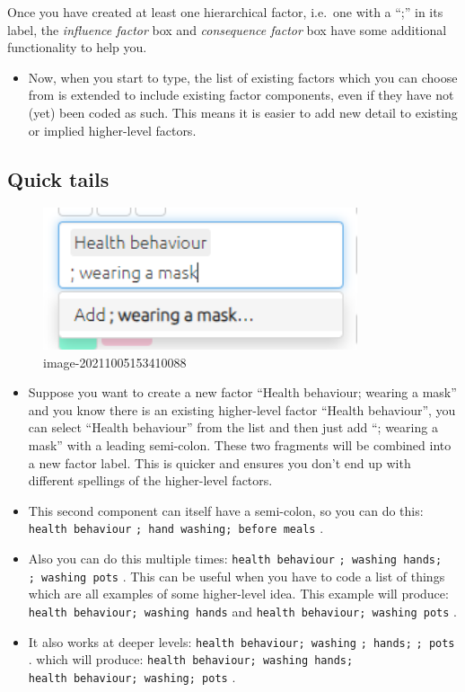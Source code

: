 \documentclass[
]{book}
\providecommand{\tightlist}{%
  \setlength{\itemsep}{0pt}\setlength{\parskip}{0pt}}
\begin{document}
Once you have created at least one hierarchical factor, i.e.~one with a ``;'' in its label, the \emph{influence factor} box and \emph{consequence factor} box have some additional functionality to help you.

\begin{itemize}
\tightlist
\item
  Now, when you start to type, the list of existing factors which you can choose from is extended to include existing factor components, even if they have not (yet) been coded as such. This means it is easier to add new detail to existing or implied higher-level factors.
\end{itemize}

\hypertarget{xquick-tails}{%
\subsection{Quick tails}\label{xquick-tails}}

\begin{figure}
\centering
\includegraphics[width=3.64583in,height=\textheight]{_assets/image-20211005153410088.png}
\caption{image-20211005153410088}
\end{figure}

\begin{itemize}
\tightlist
\item
  Suppose you want to create a new factor ``Health behaviour; wearing a mask'' and you know there is an existing higher-level factor ``Health behaviour'', you can select ``Health behaviour'' from the list and then just add ``; wearing a mask'' with a leading semi-colon. These two fragments will be combined into a new factor label. This is quicker and ensures you don't end up with different spellings of the higher-level factors.
\item
  This second component can itself have a semi-colon, so you can do this: \texttt{health\ behaviour} \texttt{;\ hand\ washing;\ before\ meals} .
\item
  Also you can do this multiple times:
  \texttt{health\ behaviour} \texttt{;\ washing\ hands;} \texttt{;\ washing\ pots} .
  This can be useful when you have to code a list of things which are all examples of some higher-level idea.
  This example will produce:
  \texttt{health\ behaviour;\ washing\ hands} and \texttt{health\ behaviour;\ washing\ pots} .
\item
  It also works at deeper levels:
  \texttt{health\ behaviour;\ washing} \texttt{;\ hands;} \texttt{;\ pots} .
  which will produce:
  \texttt{health\ behaviour;\ washing\ hands;} \texttt{health\ behaviour;\ washing;\ pots} .
\end{itemize}
\end{document}
